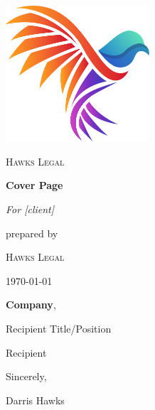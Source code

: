 \documentclass{article}
\title{\vspace{-1in}}
\author{}
\date{}
\newcommand{\recipientcompany}{Company}%
\newcommand{\recipientlocation}{\vspace{12pt}}
\newcommand{\recipientposition}{Recipient Title/Position}
\newcommand{\recipient}{Recipient}
\newcommand{\addressee}
{
{\bfseries\recipientcompany},
\vspace{-12pt}

\recipientlocation
\vspace{-12pt}

\recipientposition
\vspace{-12pt}

\recipient
}
\begin{document}
\begin{titlepage}
    \centering
    \includegraphics[width=0.4\textwidth]{Color-Logo-Hawks-Legal-Crop}\par
    {\vspace{-0.5cm}\scshape\Huge Hawks Legal\par}
    \vspace{1.5cm}
    {\Huge\bfseries Cover Page\par}
    \vspace{2cm}
    {\Large\itshape For [client]\par}
    \vfill
    prepared by\par
    \textsc{Hawks Legal}
    \vfill
    {\large \today\par}
\end{titlepage}

\maketitle

\thispagestyle{fancy}
\addressee

\normalsize
\lipsum

\vspace{3.0em}

\hspace{3em}Sincerely,

\vspace{-6pt}
	\hspace{4em}Darris Hawks
\end{document}
